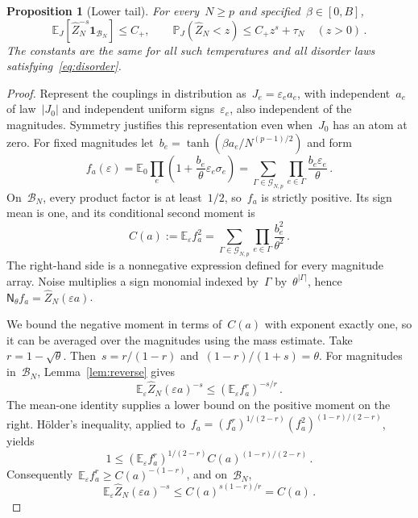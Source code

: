 \documentclass[10pt]{article}
\theoremstyle{plain}
\newtheorem{proposition}[theorem]{Proposition}
\theoremstyle{definition}
\theoremstyle{remark}
\renewcommand{\epsilon}{\varepsilon}
\begin{document}
\begin{proposition}[Lower tail]\label{prop:lower-tail}
For every~$N\ge p$ and specified~$\beta\in[0,B]$,
\begin{equation}\label{eq:lower-tail}
 \mathbb E_J[\hat Z_N^{-s}\mathbf1_{\mathcal B_N}]\le C_+,
 \qquad \mathbb P_J(\hat Z_N<z)\le C_+z^s+\tau_N\quad(z>0)\,.
\end{equation}
The constants are the same for all such temperatures and all disorder laws satisfying~\eqref{eq:disorder}.
\end{proposition}
\begin{proof}
Represent the couplings in distribution as~$J_e=\epsilon_e a_e$, with independent~$a_e$ of law~$|J_0|$ and independent uniform signs~$\epsilon_e$, also independent of the magnitudes. Symmetry justifies this representation even when~$J_0$ has an atom at zero. For fixed magnitudes let~$b_e=\tanh(\beta a_e/N^{(p-1)/2})$ and form
\begin{equation}\label{eq:inflated-function}
 f_a(\epsilon)=\mathbb E_0\prod_e\left(1+\frac{b_e}{\theta}\epsilon_e\sigma_e\right)
 =\sum_{\Gamma\in\mathcal G_{N,p}}\prod_{e\in\Gamma}\frac{b_e\epsilon_e}{\theta}\,.
\end{equation}
On~$\mathcal B_N$, every product factor is at least~$1/2$, so~$f_a$ is strictly positive. Its sign mean is one, and its conditional second moment is
\begin{equation}\label{eq:conditional-mass}
 C(a):=\mathbb E_\epsilon f_a^2
 =\sum_{\Gamma\in\mathcal G_{N,p}}\prod_{e\in\Gamma}\frac{b_e^2}{\theta^2}\,.
\end{equation}
The right-hand side is a nonnegative expression defined for every magnitude array. Noise multiplies a sign monomial indexed by~$\Gamma$ by~$\theta^{|\Gamma|}$, hence~$\mathsf N_\theta f_a=\hat Z_N(\epsilon a)$.

We bound the negative moment in terms of~$C(a)$ with exponent exactly one, so it can be averaged over the magnitudes using the mass estimate. Take~$r=1-\sqrt\theta$. Then~$s=r/(1-r)$ and~$(1-r)/(1+s)=\theta$. For magnitudes in~$\mathcal B_N$, Lemma~\ref{lem:reverse} gives
\begin{equation*}
 \mathbb E_\epsilon\hat Z_N(\epsilon a)^{-s}
 \le(\mathbb E_\epsilon f_a^r)^{-s/r}\,.
\end{equation*}
The mean-one identity supplies a lower bound on the positive moment on the right. H\"older's inequality, applied to~$f_a=(f_a^r)^{1/(2-r)}(f_a^2)^{(1-r)/(2-r)}$, yields
\begin{equation*}
 1\le(\mathbb E_\epsilon f_a^r)^{1/(2-r)}C(a)^{(1-r)/(2-r)}\,.
\end{equation*}
Consequently~$\mathbb E_\epsilon f_a^r\ge C(a)^{-(1-r)}$, and on~$\mathcal B_N$,
\begin{equation*}
 \mathbb E_\epsilon\hat Z_N(\epsilon a)^{-s}\le C(a)^{s(1-r)/r}=C(a)\,.
\end{equation*}


\end{proof}
\end{document}
